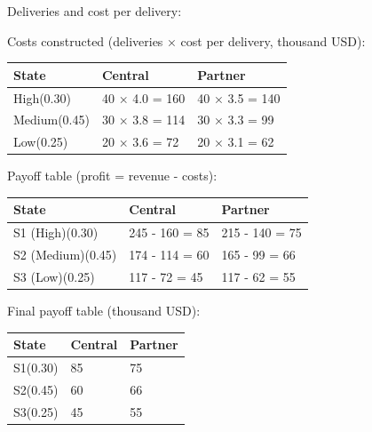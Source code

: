 \documentclass[11pt]{article}
\begin{document}
	Deliveries and cost per delivery:
	
	Costs constructed (deliveries × cost per delivery, thousand USD):
	\begin{center}
		\begin{tabular}{lll}
			\toprule
			State & Central & Partner \\
			\midrule
			High\newline (0.30) & 40 × 4.0 = 160 & 40 × 3.5 = 140 \\
			Medium\newline (0.45) & 30 × 3.8 = 114 & 30 × 3.3 = 99 \\
			Low\newline (0.25) & 20 × 3.6 = 72 & 20 × 3.1 = 62 \\
			\bottomrule
		\end{tabular}
	\end{center}
	
	
	Payoff table (profit = revenue - costs):
	\begin{center}
		\begin{tabular}{lll}
			\toprule
			State & Central & Partner \\
			\midrule
			S1 (High)\newline (0.30) & 245 - 160 = 85 & 215 - 140 = 75 \\
			S2 (Medium)\newline (0.45) & 174 - 114 = 60 & 165 - 99 = 66 \\
			S3 (Low)\newline (0.25) & 117 - 72 = 45 & 117 - 62 = 55 \\
			\bottomrule
		\end{tabular}
	\end{center}
	
	
	Final payoff table (thousand USD):
	\begin{center}
		\begin{tabular}{lll}
			\toprule
			State & Central & Partner \\
			\midrule
			S1\newline (0.30) & 85 & 75 \\
			S2\newline (0.45) & 60 & 66 \\
			S3\newline (0.25) & 45 & 55 \\
			\bottomrule
		\end{tabular}
	\end{center}
	
	
	
\end{document}
